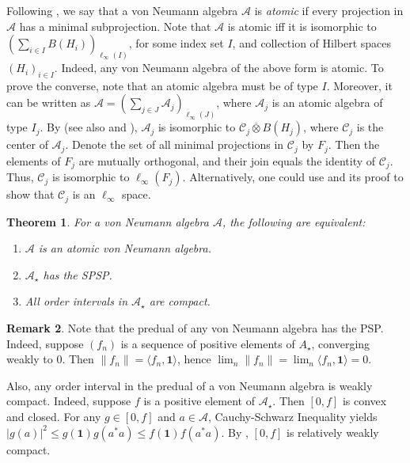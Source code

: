 \documentclass[12pt]{amsart}
\theoremstyle{plain}
\newtheorem{theorem}{Theorem}[subsection]
\theoremstyle{definition}
\newtheorem{remark}[theorem]{Remark}
\renewcommand{\leq}{\leqslant}
\newcommand{\one}{\mathbf{1}}
\newcommand{\A}{\mathcal{A}}
\begin{document}
Following \cite[Definition III.5.9]{Tak},
we say that a von Neumann algebra $\A$ is \emph{atomic} if every
projection in $\A$ has a minimal subprojection.
Note that $\A$ is atomic iff it is isomorphic to
$(\sum_{i \in I} B(H_i))_{\ell_\infty(I)}$, for some index
set $I$, and collection of Hilbert spaces $(H_i)_{i \in I}$.
Indeed, any von Neumann algebra of the above form is atomic.
To prove the converse, note that an atomic algebra must be
of type $I$. Moreover, it can be written as
$\A = (\sum_{j \in J} \A_j)_{\ell_\infty(J)}$,
where $\A_j$ is an atomic algebra of type $I_j$.
By \cite[Theorem V.1.27]{Tak} (see also \cite[Theorem 6.6.5]{KR2}
and \cite[III.1.5.3]{Bl}),
$\A_j$ is isomorphic to ${\mathcal{C}}_j \overline{\otimes} B(H_j)$,
where ${\mathcal{C}}_j$ is the center of $\A_j$.
Denote the set of all minimal projections in ${\mathcal{C}}_j$
by $F_j$. Then the elements of $F_j$ are mutually orthogonal, and
their join equals the identity of ${\mathcal{C}}_j$. Thus,
${\mathcal{C}}_j$ is isomorphic to $\ell_\infty(F_j)$.
Alternatively, one could use \cite[III.1.5.18]{Bl}
and its proof to show that ${\mathcal{C}}_j$ is an
$\ell_\infty$ space.


\begin{theorem}\label{thm:ord int}
For a von Neumann algebra $\A$, the following are equivalent:
\begin{enumerate}
\item
$\A$ is an atomic von Neumann algebra.
\item
$\A_\star$ has the SPSP.
\item
All order intervals in $\A_\star$ are compact.
\end{enumerate}
\end{theorem}

\begin{remark}\label{rem:A_*PSP}
Note that the predual of any von Neumann algebra has the PSP.
Indeed, suppose $(f_n)$ is a sequence of positive elements of $A_\star$,
converging weakly to $0$. Then $\|f_n\| = \langle f_n, \one \rangle$,
hence $\lim_n \|f_n\| = \lim_n \langle f_n, \one \rangle = 0$.

Also, any order interval in the predual of a von Neumann algebra is
weakly compact. Indeed, 
suppose $f$ is a positive element of $\A_\star$. Then $[0,f]$
is convex and closed. For any $g \in [0,f]$ and $a \in \A$,
Cauchy-Schwarz Inequality \cite[Proposition I.9.5]{Tak} yields
$|g(a)|^2 \leq g(\one) g(a^* a) \leq f(\one) f(a^* a)$.
By \cite[Theorem III.5.4]{Tak}, $[0,f]$ is relatively weakly compact.
\end{remark}
\end{document}
